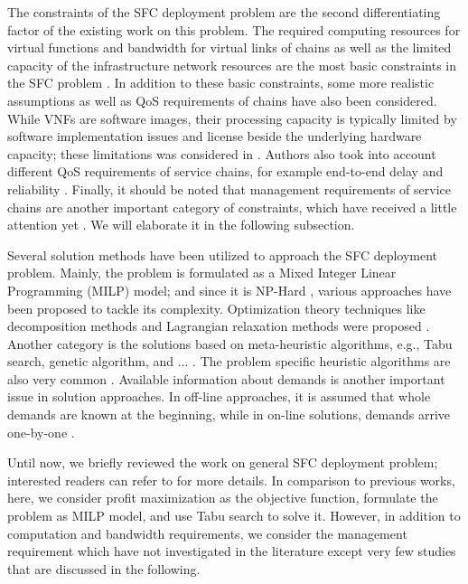 The constraints of the SFC deployment problem are the second differentiating factor of the existing work on this problem.
The required computing resources for virtual functions and bandwidth for virtual links of chains as well as the limited capacity of the infrastructure network resources are the most basic constraints in the SFC problem \cite{TahmasbiNejad2018}\cite{Eramo2016}\cite{Huang2019}.
In addition to these basic constraints, some more realistic assumptions as well as QoS requirements of chains have also been considered.
While VNFs are software images, their processing capacity is typically limited by software implementation issues and license beside the underlying hardware capacity;
these limitations was considered in \cite{Luo2020}.
Authors also took into account different QoS requirements of service chains, for example end-to-end delay \cite{Yu2017}\cite{Yaghoubpour2019} and reliability \cite{Yu2017}\cite{Torkamandi2019}\cite{Khezri2019}.
Finally, it should be noted that management requirements of service chains are another important category of constraints, which have received a little attention yet \cite{AbuLebdeh2017}\cite{AbuLebdeh20172}\cite{Chiang2019}.
We will elaborate it in the following subsection.

Several solution methods have been utilized to approach the SFC deployment problem.
Mainly, the problem is formulated as a Mixed Integer Linear Programming (MILP) model; and since it is NP-Hard \cite{Eramo2016}\cite{Ma2017}, various approaches have been proposed to tackle its complexity.
Optimization theory techniques like decomposition methods and Lagrangian relaxation methods were proposed \cite{Liu2017}\cite{Farkiani2019}\cite{1709.04772}.
Another category is the solutions based on meta-heuristic algorithms, e.g., Tabu search, genetic algorithm, and ... \cite{AbuLebdeh2017}.
The problem specific heuristic algorithms are also very common \cite{Ghaznavi2017}\cite{Bari2015}\cite{Eramo2016}.
Available information about demands is another important issue in solution approaches.
In off-line approaches, it is assumed that whole demands are known at the beginning, while in on-line solutions, demands arrive one-by-one \cite{Alhussein2020}.

Until now, we briefly reviewed the work on general SFC deployment problem; interested readers can refer to \cite{Laghrissi2019} for more details.
In comparison to previous works, here, we consider profit maximization as the objective function, formulate the problem as MILP model, and use Tabu search to solve it.
However, in addition to computation and bandwidth requirements, we consider the management requirement which have not investigated in the literature except very few studies that are discussed in the following. 

